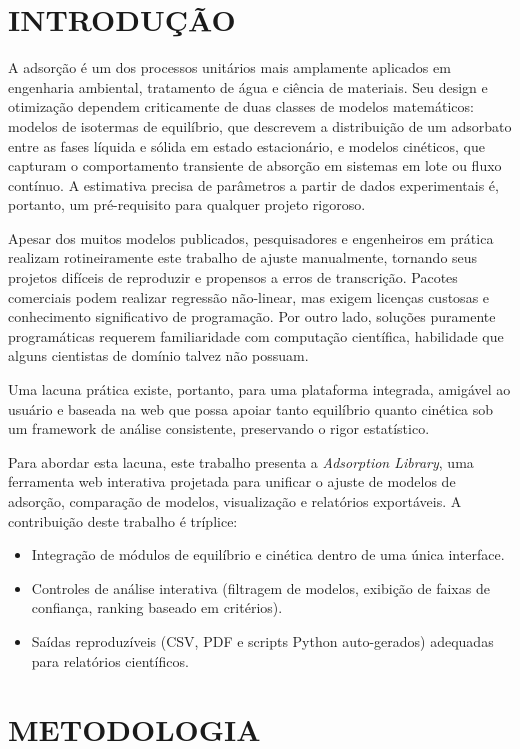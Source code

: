 \documentclass[openany, a4paper, twoside]{article}
\begin{document}
\section{INTRODUÇÃO}

A adsorção é um dos processos unitários mais amplamente aplicados em engenharia ambiental, tratamento de água e ciência de materiais. Seu design e otimização dependem criticamente de duas classes de modelos matemáticos: modelos de isotermas de equilíbrio, que descrevem a distribuição de um adsorbato entre as fases líquida e sólida em estado estacionário, e modelos cinéticos, que capturam o comportamento transiente de absorção em sistemas em lote ou fluxo contínuo. A estimativa precisa de parâmetros a partir de dados experimentais é, portanto, um pré-requisito para qualquer projeto rigoroso.

Apesar dos muitos modelos publicados, pesquisadores e engenheiros em prática realizam rotineiramente este trabalho de ajuste manualmente, tornando seus projetos difíceis de reproduzir e propensos a erros de transcrição. Pacotes comerciais podem realizar regressão não-linear, mas exigem licenças custosas e conhecimento significativo de programação. Por outro lado, soluções puramente programáticas requerem familiaridade com computação científica, habilidade que alguns cientistas de domínio talvez não possuam.

Uma lacuna prática existe, portanto, para uma plataforma integrada, amigável ao usuário e baseada na web que possa apoiar tanto equilíbrio quanto cinética sob um framework de análise consistente, preservando o rigor estatístico.

Para abordar esta lacuna, este trabalho presenta a \textit{Adsorption Library}, uma ferramenta web interativa projetada para unificar o ajuste de modelos de adsorção, comparação de modelos, visualização e relatórios exportáveis. A contribuição deste trabalho é tríplice:

\begin{itemize}
	\item Integração de módulos de equilíbrio e cinética dentro de uma única interface.
	\item Controles de análise interativa (filtragem de modelos, exibição de faixas de confiança, ranking baseado em critérios).
	\item Saídas reproduzíveis (CSV, PDF e scripts Python auto-gerados) adequadas para relatórios científicos.
\end{itemize}

\section{METODOLOGIA}
\end{document}
